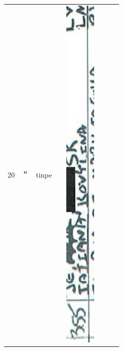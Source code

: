 \documentclass[10pt]{article}
\begin{document}
\begin{center}
\begin{tabular}{|c|c|c|c|c|c|c|c|}
 &  &  &  \\
\hline
20 & ＂ & tinpe &  & \includegraphics[max width=\textwidth]{2025_02_27_dd68c3d38de88f0516d9g-122(5)}

\end{tabular}
\end{center}
\end{document}

